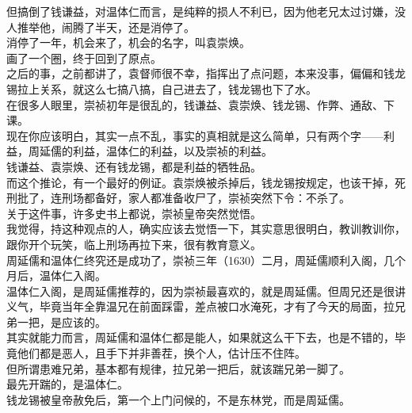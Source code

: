 \begin{multicols}{\theparacolNo}
但搞倒了钱谦益，对温体仁而言，是纯粹的损人不利已，因为他老兄太过讨嫌，没人推举他，闹腾了半天，还是消停了。\\

消停了一年，机会来了，机会的名字，叫袁崇焕。\\

画了一个圈，终于回到了原点。\\

之后的事，之前都讲了，袁督师很不幸，指挥出了点问题，本来没事，偏偏和钱龙锡拉上关系，就这么七搞八搞，自己进去了，钱龙锡也下了水。\\

在很多人眼里，崇祯初年是很乱的，钱谦益、袁崇焕、钱龙锡、作弊、通敌、下课。\\

现在你应该明白，其实一点不乱，事实的真相就是这么简单，只有两个字——利益，周延儒的利益，温体仁的利益，以及崇祯的利益。\\

钱谦益、袁崇焕、还有钱龙锡，都是利益的牺牲品。\\

而这个推论，有一个最好的例证。袁崇焕被杀掉后，钱龙锡按规定，也该干掉，死刑批了，连刑场都备好，家人都准备收尸了，崇祯突然下令：不杀了。\\

关于这件事，许多史书上都说，崇祯皇帝突然觉悟。\\

我觉得，持这种观点的人，确实应该去觉悟一下，其实意思很明白，教训教训你，跟你开个玩笑，临上刑场再拉下来，很有教育意义。\\

周延儒和温体仁终究还是成功了，崇祯三年（1630）二月，周延儒顺利入阁，几个月后，温体仁入阁。\\

温体仁入阁，是周延儒推荐的，因为崇祯最喜欢的，就是周延儒。但周兄还是很讲义气，毕竟当年全靠温兄在前面踩雷，差点被口水淹死，才有了今天的局面，拉兄弟一把，是应该的。\\

其实就能力而言，周延儒和温体仁都是能人，如果就这么干下去，也是不错的，毕竟他们都是恶人，且手下并非善茬，换个人，估计压不住阵。\\

但所谓患难兄弟，基本都有规律，拉兄弟一把后，就该踹兄弟一脚了。\\

最先开踹的，是温体仁。\\

钱龙锡被皇帝赦免后，第一个上门问候的，不是东林党，而是周延儒。\\


\end{multicols}
